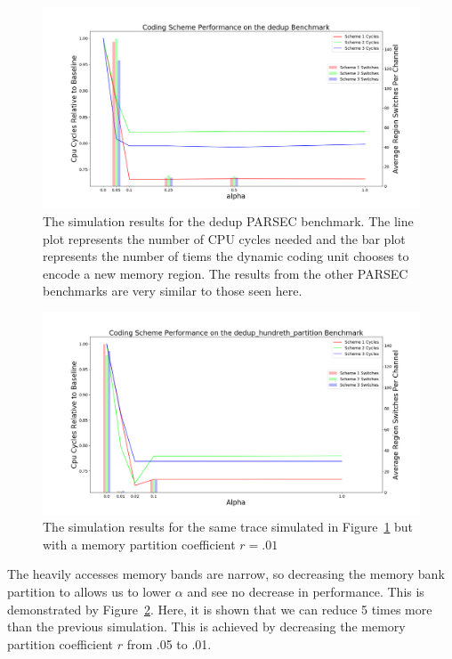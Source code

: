 \begin{figure}[htbp]
		\includegraphics[width=\linewidth]{fig/dedup_benchmark_results.png}
		\caption{The simulation results for the dedup PARSEC benchmark. The line plot represents the number of CPU cycles needed and the bar plot represents the number of tiems the dynamic coding unit chooses to encode a new memory region. The results from the other PARSEC benchmarks are very similar to those seen here.}
		\label{fig:dedup_results}
\end{figure}
\begin{figure}[htbp]
		\includegraphics[width=\linewidth]{fig/dedup_hundreth.png}
		\caption{The simulation results for the same trace simulated in Figure~\ref{fig:dedup_results} but with a memory partition coefficient $r = .01$}
		\label{fig:dedup_hundreth}
\end{figure}

The heavily accesses memory bands are narrow, so decreasing the memory bank partition to allows us to lower $\alpha$ and see no decrease in performance. This is demonstrated by Figure~\ref{fig:dedup_hundreth}. Here, it is shown that we can reduce 5 times more than the previous simulation. This is achieved by decreasing the memory partition coefficient $r$ from .05 to .01.


